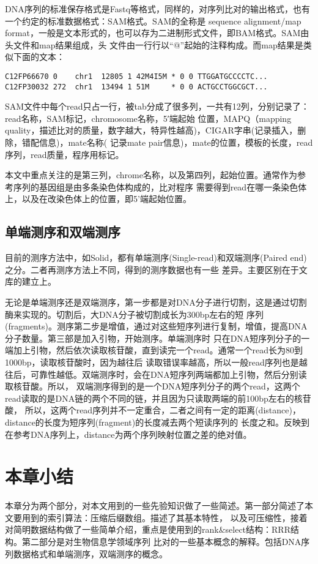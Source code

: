 DNA序列的标准保存格式是Fastq等格式，同样的，对序列比对的输出格式，也有一个约定的标准数据格式：SAM格式。SAM的全称是
sequence alignment/map format，一般是文本形式的，也可以存为二进制形式文件，即BAM格式。SAM由头文件和map结果组成，头
文件由一行行以“@”起始的注释构成。而map结果是类似下面的文本：

\begin{verbatim}
C12FP66670 0    chr1  12805 1 42M4I5M * 0 0 TTGGATGCCCCTC...
C12FP30032 272  chr1  13494 1 51M     * 0 0 ACTGCCTGGCGCT...
\end{verbatim}

SAM文件中每个read只占一行，被tab分成了很多列，一共有12列，分别记录了：read名称，SAM标记，chromosome名称，5′端起始
位置，MAPQ（mapping quality，描述比对的质量，数字越大，特异性越高)，CIGAR字串(记录插入，删除，错配信息)，mate名称(
记录mate pair信息)，mate的位置，模板的长度，read序列，read质量，程序用标记。

本文中重点关注的是第三列，chrome名称，以及第四列，起始位置。通常作为参考序列的基因组是由多条染色体构成的，比对程序
需要得到read在哪一条染色体上，以及在改染色体上的位置，即5'端起始位置。

\subsection{单端测序和双端测序}
目前的测序方法中，如Solid，都有单端测序(Single-read)和双端测序(Paired end)之分。二者再测序方法上不同，得到的测序数据也有一些
差异。主要区别在于文库的建立上。

无论是单端测序还是双端测序，第一步都是对DNA分子进行切割，这是通过切割酶来实现的。切割后，大DNA分子被切割成长为300bp左右的短
序列(fragments)。测序第二步是增值，通过对这些短序列进行复制，增值，提高DNA分子数量。第三部是加入引物，开始测序。单端测序时
只在DNA短序列分子的一端加上引物，然后依次读取核苷酸，直到读完一个read。通常一个read长为80到1000bp，读取核苷酸时，因为越往后
读取错误率越高，所以一般read序列也是越往后，可靠性越低。双端测序时，会在DNA短序列两端都加上引物，然后分别读取核苷酸。所以，
双端测序得到的是一个DNA短序列分子的两个read，这两个read读取的是DNA链的两个不同的链，并且因为只读取两端的前100bp左右的核苷酸，
所以，这两个read序列并不一定重合，二者之间有一定的距离(distance)，distance的长度为短序列(fragment)的长度减去两个短读序列的
长度之和。反映到在参考DNA序列上，distance为两个序列映射位置之差的绝对值。

\section{本章小结}
本章分为两个部分，对本文用到的一些先验知识做了一些简述。第一部分简述了本文要用到的索引算法：压缩后缀数组。描述了其基本特性，
以及可压缩性，接着对简明数据结构做了一些简单介绍，重点是使用到的rank\&select结构：RRR结构。第二部分是对生物信息学领域序列
比对的一些基本概念的解释。包括DNA序列数据格式和单端测序，双端测序的概念。
